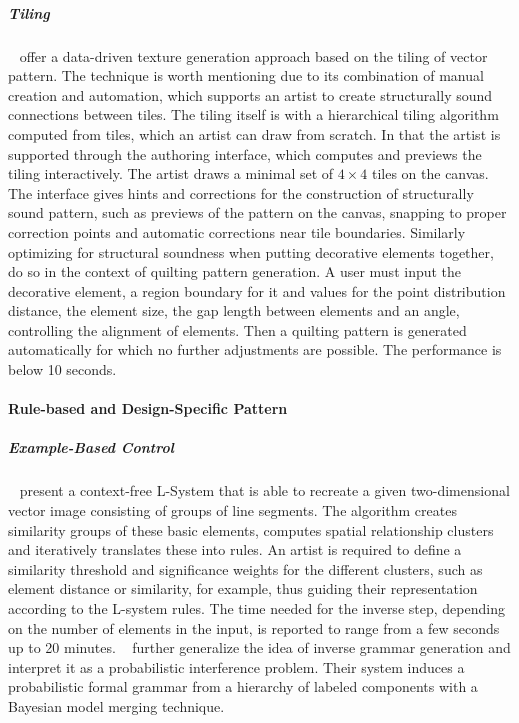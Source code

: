 \subparagraph{Tiling}
\label{subpara:analysis_regular_examplebased_control_tiling}

\citeauthor*{bian_2018_tpd}~\cite{bian_2018_tpd} offer a data-driven texture generation approach based on the tiling of vector pattern. The technique is worth mentioning due to its combination of manual creation and automation, which supports an artist to create structurally sound connections between tiles. The tiling itself is with a hierarchical tiling algorithm computed from tiles, which an artist can draw from scratch. In that the artist is supported through the authoring interface, which computes and previews the tiling interactively. The artist draws a minimal set of $4\times4$ tiles on the canvas. The interface gives hints and corrections for the construction of structurally sound pattern, such as previews of the pattern on the canvas, snapping to proper correction points and automatic corrections near tile boundaries. Similarly optimizing for structural soundness when putting decorative elements together,~\citeauthor*{li_2019_aqp}~\cite{li_2019_aqp} do so in the context of quilting pattern generation. A user must input the decorative element, a region boundary for it and values for the point distribution distance, the element size, the gap length between elements and an angle, controlling the alignment of elements. Then a quilting pattern is generated automatically for which no further adjustments are possible. The performance is below 10 seconds.





\paragraph{Rule-based and Design-Specific Pattern}
\label{subsubsec:analysis_rulebased_and_designspecific}


\subparagraph{Example-Based Control}

\citeauthor*{stava_2010_ipm}~\cite{stava_2010_ipm} present a context-free L-System that is able to recreate a given two-dimensional vector image consisting of groups of line segments. The algorithm creates similarity groups of these basic elements, computes spatial relationship clusters and iteratively translates these into rules. An artist is required to define a similarity threshold and significance weights for the different clusters, such as element distance or similarity, for example, thus guiding their representation according to the L-system rules. The time needed for the inverse step, depending on the number of elements in the input, is reported to range from a few seconds up to 20 minutes. \citeauthor*{talton_2012_ldp}~\cite{talton_2012_ldp} further generalize the idea of inverse grammar generation and interpret it as a probabilistic interference problem. Their system induces a probabilistic formal grammar from a hierarchy of labeled components with a Bayesian model merging technique.

